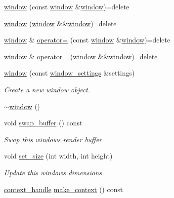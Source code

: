 \begin{DoxyCompactItemize}
\item 
\mbox{\hyperlink{classmoka_1_1window_aa92731ac0e7e3f4b204f3a770d0a3016}{window}} (const \mbox{\hyperlink{classmoka_1_1window}{window}} \&\mbox{\hyperlink{classmoka_1_1window}{window}})=delete
\item 
\mbox{\hyperlink{classmoka_1_1window_adcf2b4d7098619cd9cbf2b83060a9fbf}{window}} (\mbox{\hyperlink{classmoka_1_1window}{window}} \&\&\mbox{\hyperlink{classmoka_1_1window}{window}})=delete
\item 
\mbox{\hyperlink{classmoka_1_1window}{window}} \& \mbox{\hyperlink{classmoka_1_1window_ae6041c42675d2d9c6f82f512f7cd81a1}{operator=}} (const \mbox{\hyperlink{classmoka_1_1window}{window}} \&\mbox{\hyperlink{classmoka_1_1window}{window}})=delete
\item 
\mbox{\hyperlink{classmoka_1_1window}{window}} \& \mbox{\hyperlink{classmoka_1_1window_a9628b3208bebe35dc9e2fd4b77c1cc22}{operator=}} (\mbox{\hyperlink{classmoka_1_1window}{window}} \&\&\mbox{\hyperlink{classmoka_1_1window}{window}})=delete
\item 
\mbox{\hyperlink{classmoka_1_1window_a65c37d2ed8385c4b1ab529724bbfdcc2}{window}} (const \mbox{\hyperlink{structmoka_1_1window__settings}{window\+\_\+settings}} \&settings)
\begin{DoxyCompactList}\small\item\em Create a new window object. \end{DoxyCompactList}\item 
\mbox{\hyperlink{classmoka_1_1window_aaf7bdf23272f0ef95201a93d452246c7}{$\sim$window}} ()
\item 
void \mbox{\hyperlink{classmoka_1_1window_a7d1752b776c77ac0885d44fdba2fa0d7}{swap\+\_\+buffer}} () const
\begin{DoxyCompactList}\small\item\em Swap this window\textquotesingle{}s render buffer. \end{DoxyCompactList}\item 
void \mbox{\hyperlink{classmoka_1_1window_a27e22f3cc6c8cf11ee056921374fb234}{set\+\_\+size}} (int width, int height)
\begin{DoxyCompactList}\small\item\em Update this window\textquotesingle{}s dimensions. \end{DoxyCompactList}\item 
\mbox{\hyperlink{structmoka_1_1context__handle}{context\+\_\+handle}} \mbox{\hyperlink{classmoka_1_1window_ab9372d21cceb71d9934f842ca5c6eab6}{make\+\_\+context}} () const

\end{DoxyCompactItemize}
